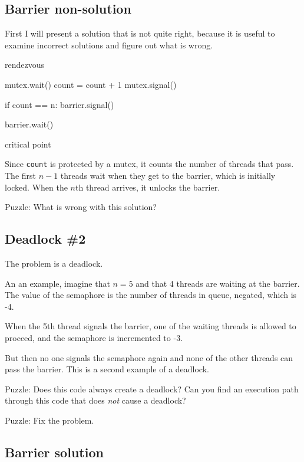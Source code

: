 \documentclass{book}
\begin{document}
\subsection {Barrier non-solution}

First I will present a solution that is not quite right, because
it is useful to examine incorrect solutions and figure out what
is wrong.


\begin{unbreakable}[title={Barrier non-solution}]{}
rendezvous

mutex.wait()
    count = count + 1
mutex.signal()

if count == n: barrier.signal()

barrier.wait()

critical point
\end{unbreakable}

Since {\tt count} is protected by a mutex, it counts the number of
threads that pass.  The first $n-1$ threads wait when they get to the
barrier, which is initially locked.  When the $n$th thread arrives, it
unlocks the barrier.

Puzzle:  What is wrong with this solution?



\subsection{Deadlock \#2}

The problem is a deadlock.

An an example, imagine that $n=5$
and that 4 threads are waiting at the barrier.  The value
of the semaphore is the number of threads in queue, negated,
which is -4.

When the 5th thread signals the barrier, one of the waiting
threads is allowed to proceed, and the semaphore is incremented
to -3.

But then no one signals the semaphore again and none of the
other threads can pass the barrier.
This is a second example of a deadlock.

Puzzle: Does this code always create a deadlock?  Can you find an
execution path through this code that does {\em not} cause a deadlock?

Puzzle: Fix the problem.



\subsection{Barrier solution}
\label{barrier}
\end{document}
